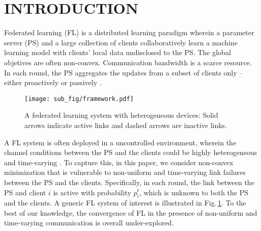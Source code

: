\documentclass[letterpaper, 10 pt, conference]{ieeeconf}  %
\begin{document}
\section{INTRODUCTION}
\label{sec: intro}
Federated learning (FL) %
is a distributed learning paradigm wherein a parameter server (PS) and a large collection of clients collaboratively learn a machine learning model with clients' local data undisclosed \cite{mcmahan2017communication,kairouz2021advances} to the PS. 
The global objetives are often non-convex. Communication bandwidth is a scarce resource. %
In each round, the PS aggregates the updates from a subset of clients only -- either proactively \cite{mcmahan2017communication,kairouz2021advances} or passively \cite{Li2020,philippenko2020bidirectional,wang2022}.  
\begin{figure} 
    \centering
    \texttt{[image: sub\_fig/framework.pdf]}
    \caption{A federated learning system with heterogeneous devices: Solid arrows indicate active links and dashed arrows are inactive links.} 
    \label{fig:FL systems}
\end{figure}
\setlength{\parskip}{0mm}
A FL system is often deployed in a uncontrolled environment, wherein the channel conditions between the PS and the clients could be highly heterogeneous and time-varying \cite{mcmahan2017communication}. 
To capture this, in this paper, we consider non-convex minimization that is vulnerable to non-uniform and time-varying link failures between the PS and the clients. 
Specifically, in each round, the link between the PS and client $i$ is active with probability $p_i^t$, which %
is unknown to both the PS and the clients. A generic FL system of interest is illustrated in Fig.\,\ref{fig:FL systems}. To the best of our knowledge, the convergence of FL in the presence of non-uniform and time-varying communication is overall under-explored. 
\end{document}

